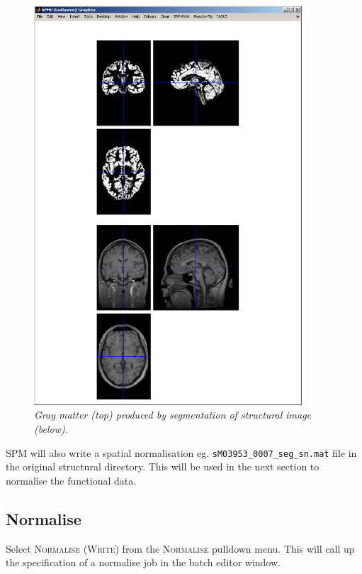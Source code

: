 \begin{figure}
\begin{center}
\includegraphics[width=100mm]{faces/gray}
\caption{\em Gray matter (top) produced by segmentation of structural image (below). \label{face_gray}}
\end{center}
\end{figure}

SPM will also write a spatial normalisation eg. \texttt{sM03953\_0007\_seg\_sn.mat} file in the original structural directory. This will be used in the next section to normalise the functional data. 

\subsection{Normalise}

Select \textsc{Normalise (Write)} from the \textsc{Normalise} pulldown menu. This will call up the specification of a normalise job in the batch editor window. 

